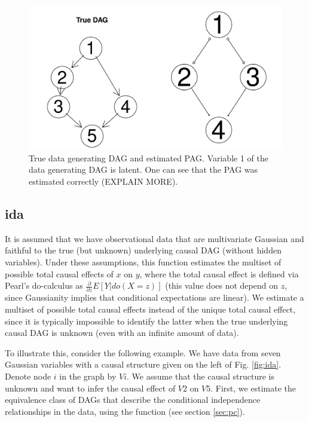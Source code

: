 \documentclass[article]{jss}
\begin{document}
\begin{figure}
  \begin{center}
\includegraphics{pcalgDoc-013}
\caption{True data generating DAG and estimated PAG. Variable 1 of the data
generating DAG is latent. One can see that the PAG was estimated correctly
(EXPLAIN MORE).}
\label{fig:fci}
\end{center}
\end{figure}

\subsection{ida} \label{sec:ida}
It is assumed that we have observational data that are multivariate
Gaussian and faithful to the true (but unknown) underlying causal DAG
(without hidden variables).  Under these assumptions, this function
estimates the multiset of possible total causal effects of $x$ on $y$,
where the total causal effect is defined via Pearl's do-calculus as
$\frac{\partial}{\partial z} E[Y|do(X=z)]$ (this value does not depend on $z$, since
Gaussianity implies that conditional expectations are linear). We estimate
a multiset of possible total causal effects instead of the unique total causal
effect, since it is typically impossible to identify the latter when the
true underlying causal DAG is unknown (even with an infinite amount of
data).

To illustrate this, consider the following example. We have data from seven
Gaussian variables with a causal structure given on the left of
Fig. \ref{fig:ida}. Denote node $i$ in the graph by $Vi$. We assume that
the causal structure is unknown and want to infer the causal effect of $V2$
on $V5$. First, we estimate the equivalence class of DAGs that describe the
conditional independence relationships in the data, using the function
 (see section \ref{sec:pc}).
\end{document}
